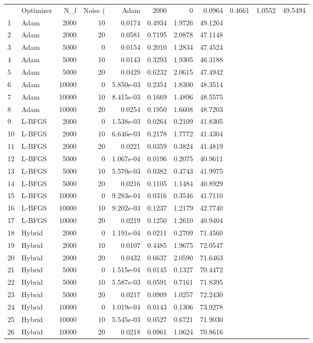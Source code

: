 \begin{tabular}{llrrrrrr}
\toprule
 & Optimizer & N_f & Noise (%
 & Adam & 2000 & 0 & 0.0964 & 0.4661 & 1.0552 & 49.5494 \\
1 & Adam & 2000 & 10 & 0.0174 & 0.4934 & 1.9726 & 49.1264 \\
2 & Adam & 2000 & 20 & 0.0581 & 0.7195 & 2.0878 & 47.1148 \\
3 & Adam & 5000 & 0 & 0.0154 & 0.2010 & 1.2834 & 47.4524 \\
4 & Adam & 5000 & 10 & 0.0143 & 0.3293 & 1.9305 & 46.3188 \\
5 & Adam & 5000 & 20 & 0.0429 & 0.6232 & 2.0615 & 47.4942 \\
6 & Adam & 10000 & 0 & 5.850e-03 & 0.2354 & 1.8300 & 48.3514 \\
7 & Adam & 10000 & 10 & 8.415e-03 & 0.1669 & 1.4896 & 48.5575 \\
8 & Adam & 10000 & 20 & 0.0254 & 0.1950 & 1.6608 & 48.7203 \\
9 & L-BFGS & 2000 & 0 & 1.538e-03 & 0.0264 & 0.2109 & 41.8305 \\
10 & L-BFGS & 2000 & 10 & 6.646e-03 & 0.2178 & 1.7772 & 41.4304 \\
11 & L-BFGS & 2000 & 20 & 0.0221 & 0.0359 & 0.3824 & 41.4819 \\
12 & L-BFGS & 5000 & 0 & 1.067e-04 & 0.0196 & 0.2075 & 40.9611 \\
13 & L-BFGS & 5000 & 10 & 5.570e-03 & 0.0382 & 0.4743 & 41.9975 \\
14 & L-BFGS & 5000 & 20 & 0.0216 & 0.1105 & 1.1484 & 40.8929 \\
15 & L-BFGS & 10000 & 0 & 9.283e-04 & 0.0316 & 0.3546 & 41.7110 \\
16 & L-BFGS & 10000 & 10 & 9.202e-03 & 0.1237 & 1.2179 & 42.7740 \\
17 & L-BFGS & 10000 & 20 & 0.0219 & 0.1250 & 1.2610 & 40.9404 \\
18 & Hybrid & 2000 & 0 & 1.191e-04 & 0.0211 & 0.2709 & 71.4560 \\
19 & Hybrid & 2000 & 10 & 0.0107 & 0.4485 & 1.9675 & 72.0547 \\
20 & Hybrid & 2000 & 20 & 0.0432 & 0.6637 & 2.0590 & 71.6463 \\
21 & Hybrid & 5000 & 0 & 1.515e-04 & 0.0145 & 0.1327 & 70.4472 \\
22 & Hybrid & 5000 & 10 & 5.587e-03 & 0.0591 & 0.7161 & 71.8395 \\
23 & Hybrid & 5000 & 20 & 0.0217 & 0.0909 & 1.0257 & 72.2430 \\
24 & Hybrid & 10000 & 0 & 1.019e-04 & 0.0143 & 0.1306 & 73.9278 \\
25 & Hybrid & 10000 & 10 & 5.545e-03 & 0.0527 & 0.6721 & 71.9030 \\
26 & Hybrid & 10000 & 20 & 0.0218 & 0.0961 & 1.0624 & 70.8616 \\
\bottomrule
\end{tabular}
